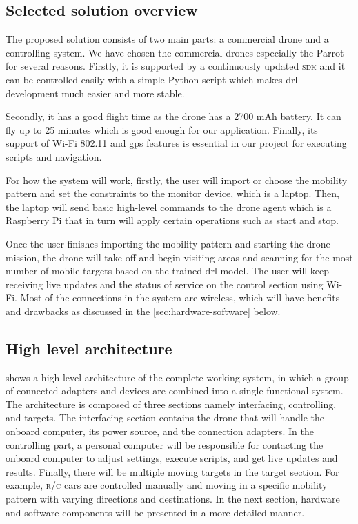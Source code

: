 \documentclass[../main.tex]{subfiles}
\begin{document}
\subsection{Selected solution overview}\label{sec:selected-solution}

The proposed solution consists of two main parts: 
a commercial drone and a controlling system.
We have chosen the commercial drones especially 
the Parrot \anafi for several reasons.
Firstly, it is supported by a continuously updated 
\textsc{sdk} and it can be controlled easily 
with a simple Python script which makes 
\gls{drl} development much easier and more stable. 

Secondly, it has a good flight time 
as the \anafi drone has a 2700 mAh battery. 
It can fly up to 25 minutes which is good enough 
for our application.
Finally, its support of Wi-Fi 802.11 and \gls{gps} 
features is essential in our project for 
executing scripts and navigation. 

For how the system will work, firstly, the user 
will import or choose the mobility pattern and set
the constraints to the monitor device,
which is a laptop. Then, the laptop will send basic
high-level commands to the drone agent which is a
Raspberry Pi that in turn will apply certain
operations such as start and stop.

Once the user finishes importing the mobility pattern
and starting the drone mission, the drone will
take off and begin visiting areas and scanning for
the most number of mobile targets based on the
trained \gls{drl} model.
The user will keep receiving live updates and the
status of service on the control section using Wi-Fi.
Most of the connections in the system are wireless,
which will have benefits and drawbacks as discussed
in the \cref{sec:hardware-software} below.

\subsection{High level architecture}

 shows a high-level architecture 
of the complete working system, in which a group 
of connected adapters and devices are combined into 
a single functional system. 
The architecture is composed of three sections namely
interfacing, controlling, and targets. 
The interfacing section contains the drone that 
will handle the onboard computer, its power source, 
and the connection adapters. 
In the controlling part, a personal computer 
will be responsible for contacting the onboard computer 
to adjust settings, execute scripts, and get 
live updates and results. 
Finally, there will be multiple moving targets 
in the target section. For example, 
\textsc{r/c} cars are controlled manually and moving in 
a specific mobility pattern with varying directions 
and destinations. 
In the next section, hardware and software components 
will be presented in a more detailed manner.
\end{document}
